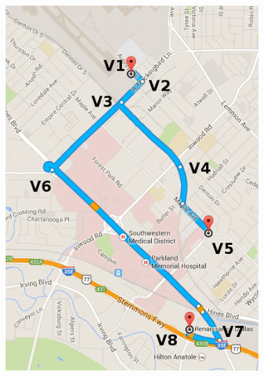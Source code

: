 \begin{frame}[red]
\begin{columns}
\begin{column}{0.5\textwidth}
  \end{column}
  \begin{column}[t]{0.5\textwidth}
  \vspace{-2.7em}
    \begin{figure}
    \includegraphics[width=0.9\textwidth]{figures/pathoverlap.png} 
    \end{figure}  \end{column}
\end{columns}
\end{frame}



